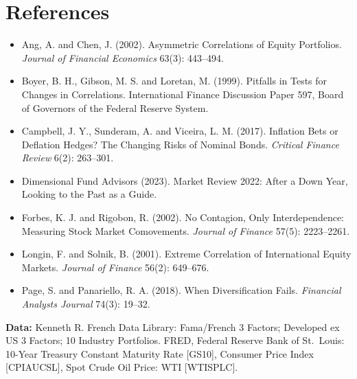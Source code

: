 \section*{References}

\begin{itemize}
  \item Ang, A. and Chen, J. (2002). Asymmetric Correlations of Equity Portfolios. \emph{Journal of Financial Economics} 63(3): 443--494.
  \item Boyer, B. H., Gibson, M. S. and Loretan, M. (1999). Pitfalls in Tests for Changes in Correlations. International Finance Discussion Paper 597, Board of Governors of the Federal Reserve System.
  \item Campbell, J. Y., Sunderam, A. and Viceira, L. M. (2017). Inflation Bets or Deflation Hedges? The Changing Risks of Nominal Bonds. \emph{Critical Finance Review} 6(2): 263--301.
  \item Dimensional Fund Advisors (2023). Market Review 2022: After a Down Year, Looking to the Past as a Guide.
  \item Forbes, K. J. and Rigobon, R. (2002). No Contagion, Only Interdependence: Measuring Stock Market Comovements. \emph{Journal of Finance} 57(5): 2223--2261.
  \item Longin, F. and Solnik, B. (2001). Extreme Correlation of International Equity Markets. \emph{Journal of Finance} 56(2): 649--676.
  \item Page, S. and Panariello, R. A. (2018). When Diversification Fails. \emph{Financial Analysts Journal} 74(3): 19--32.
\end{itemize}

\textbf{Data:} Kenneth R. French Data Library: Fama/French 3 Factors; Developed ex US 3 Factors; 10 Industry Portfolios. FRED, Federal Reserve Bank of St.\ Louis: 10-Year Treasury Constant Maturity Rate [GS10], Consumer Price Index [CPIAUCSL], Spot Crude Oil Price: WTI [WTISPLC].
